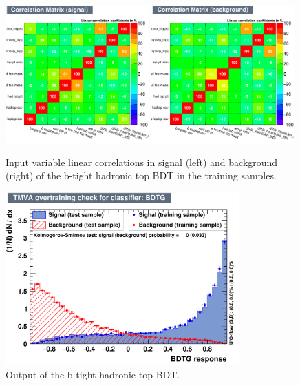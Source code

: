 \begin{figure}[hbtp]
 \begin{center}
   \includegraphics[width=0.49\textwidth]{ch9_figs/recoBdt_btight/CorrelationMatrixS.pdf}
   \includegraphics[width=0.49\textwidth]{ch9_figs/recoBdt_btight/CorrelationMatrixB.pdf}
   \caption[Input variable linear correlations of the b-tight hadronic top BDT]{Input variable linear correlations in signal (left) and background (right)
     of the b-tight hadronic top BDT in the training samples.}
   \label{fig:recoBdt_b_tight_corrMatrix}
 \end{center}
\end{figure}

\begin{figure}[hbtp]
 \begin{center}
   \includegraphics[width=0.8\textwidth]{ch9_figs/recoBdt_btight/overtrain_BDTG.pdf}
   \caption[Output of the b-tight hadronic top BDT]{Output of the b-tight hadronic top BDT.}
   \label{fig:recoBdt_btight_score}
 \end{center}
\end{figure}



